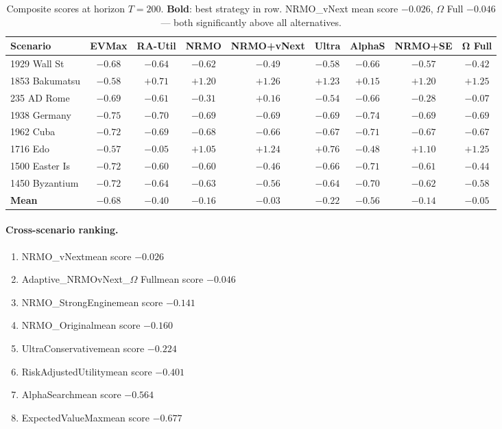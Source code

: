 \begin{table}[ht]
\centering
\scriptsize
\renewcommand{\arraystretch}{1.05}
\begin{tabularx}{\linewidth}{Xcccccccc}
\toprule
\textbf{Scenario} & \textbf{EVMax} & \textbf{RA-Util} &
\textbf{NRMO} & \textbf{NRMO+vNext} & \textbf{Ultra} &
\textbf{AlphaS} & \textbf{NRMO+SE} & \textbf{$\boldsymbol\Omega$ Full} \\
\midrule
1929 Wall St
& $-0.68$ & $-0.64$ & $-0.62$ & $-0.49$ & $-0.58$ & $-0.66$
& $-0.57$ & \textbf{$-0.42$} \\
1853 Bakumatsu
& $-0.58$ & $+0.71$ & $+1.20$ & \textbf{$+1.26$} & $+1.23$ & $+0.15$
& $+1.20$ & $+1.25$ \\
235 AD Rome
& $-0.69$ & $-0.61$ & $-0.31$ & \textbf{$+0.16$} & $-0.54$ & $-0.66$
& $-0.28$ & $-0.07$ \\
1938 Germany
& $-0.75$ & $-0.70$ & $-0.69$ & $-0.69$ & \textbf{$-0.69$} & $-0.74$
& $-0.69$ & $-0.69$ \\
1962 Cuba
& $-0.72$ & $-0.69$ & $-0.68$ & \textbf{$-0.66$} & $-0.67$ & $-0.71$
& $-0.67$ & $-0.67$ \\
1716 Edo
& $-0.57$ & $-0.05$ & $+1.05$ & $+1.24$ & $+0.76$ & $-0.48$
& $+1.10$ & \textbf{$+1.25$} \\
1500 Easter Is
& $-0.72$ & $-0.60$ & $-0.60$ & $-0.46$ & $-0.66$ & $-0.71$
& $-0.61$ & \textbf{$-0.44$} \\
1450 Byzantium
& $-0.72$ & $-0.64$ & $-0.63$ & \textbf{$-0.56$} & $-0.64$ & $-0.70$
& $-0.62$ & $-0.58$ \\
\midrule
\textbf{Mean} & \textbf{$-0.68$} & $-0.40$ & $-0.16$ & \textbf{$-0.03$} & $-0.22$ & $-0.56$
& $-0.14$ & $-0.05$ \\
\bottomrule
\end{tabularx}
\caption[Per-scenario composite scores]{Composite scores at
horizon $T = 200$. \textbf{Bold}: best strategy in row. NRMO\_vNext
mean score $-0.026$, $\Omega$ Full $-0.046$ ---
both significantly above all alternatives.}
\label{tab:hist-scores}
\end{table}

\paragraph{Cross-scenario ranking.}

\begin{enumerate}[label=\arabic*., itemsep=1pt]
\item NRMO\_vNext\hfill mean score $-0.026$
\item Adaptive\_NRMOvNext\_$\Omega$ Full\hfill mean score $-0.046$
\item NRMO\_StrongEngine\hfill mean score $-0.141$
\item NRMO\_Original\hfill mean score $-0.160$
\item UltraConservative\hfill mean score $-0.224$
\item RiskAdjustedUtility\hfill mean score $-0.401$
\item AlphaSearch\hfill mean score $-0.564$
\item ExpectedValueMax\hfill mean score $-0.677$
\end{enumerate}

